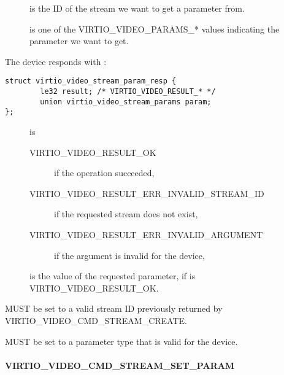 \begin{description}
\item[]
is the ID of the stream we want to get a parameter from.
\item[]
is one of the VIRTIO_VIDEO_PARAMS_* values indicating the parameter
we want to get.
\end{description}

The device responds with :

\begin{lstlisting}
struct virtio_video_stream_param_resp {
        le32 result; /* VIRTIO_VIDEO_RESULT_* */
        union virtio_video_stream_params param;
};
\end{lstlisting}

\begin{description}
\item[]
is

\begin{description}
\item[VIRTIO_VIDEO_RESULT_OK]
if the operation succeeded,
\item[VIRTIO_VIDEO_RESULT_ERR_INVALID_STREAM_ID]
if the requested stream does not exist,
\item[VIRTIO_VIDEO_RESULT_ERR_INVALID_ARGUMENT]
if the  argument is invalid for the device,
\end{description}
\item[]
is the value of the requested parameter, if  is
VIRTIO_VIDEO_RESULT_OK.
\end{description}


 MUST be set to a valid stream ID previously returned
by VIRTIO_VIDEO_CMD_STREAM_CREATE.

 MUST be set to a parameter type that is valid for the
device.

\paragraph{VIRTIO_VIDEO_CMD_STREAM_SET_PARAM}\label{sec:Device Types / Video Device / Device Operation / Device Operation: Stream commands / VIRTIO_VIDEO_CMD_STREAM_SET_PARAM}

